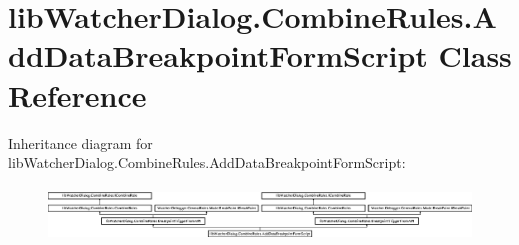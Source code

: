 \hypertarget{classlib_watcher_dialog_1_1_combine_rules_1_1_add_data_breakpoint_form_script}{\section{lib\+Watcher\+Dialog.\+Combine\+Rules.\+Add\+Data\+Breakpoint\+Form\+Script Class Reference}
\label{classlib_watcher_dialog_1_1_combine_rules_1_1_add_data_breakpoint_form_script}
}
Inheritance diagram for lib\+Watcher\+Dialog.\+Combine\+Rules.\+Add\+Data\+Breakpoint\+Form\+Script\+:\begin{figure}[H]
\begin{center}
\leavevmode
\includegraphics[height=1.489362cm]{classlib_watcher_dialog_1_1_combine_rules_1_1_add_data_breakpoint_form_script}
\end{center}
\end{figure}
